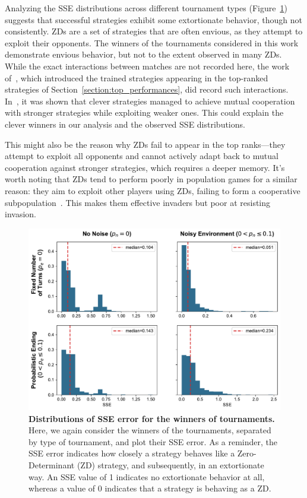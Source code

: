 \documentclass{article}
\begin{document}
Analyzing the SSE distributions across different tournament types
(Figure~\ref{fig:discussion_sse}) suggests that successful strategies exhibit
some extortionate behavior, though not consistently. ZDs are a set of strategies
that are often envious, as they attempt to exploit their opponents. The winners
of the tournaments considered in this work demonstrate envious behavior, but not
to the extent observed in many ZDs. While the exact interactions between matches
are not recorded here, the work of~\cite{Harper2017}, which introduced the
trained strategies appearing in the top-ranked strategies of
Section~\ref{section:top_performances}, did record such interactions.
In~\cite{Harper2017}, it was shown that clever strategies managed to achieve
mutual cooperation with stronger strategies while exploiting weaker ones. This
could explain the clever winners in our analysis and the observed SSE
distributions.

This might also be the reason why ZDs fail to appear in the top ranks—they
attempt to exploit all opponents and cannot actively adapt back to mutual
cooperation against stronger strategies, which requires a deeper memory. It's
worth noting that ZDs tend to perform poorly in population games for a similar
reason: they aim to exploit other players using ZDs, failing to form a
cooperative subpopulation~\cite{Knight2018evolution}. This makes them effective
invaders but poor at resisting invasion.

\begin{figure}[!htbp]
    \centering
        \centering
        \includegraphics[width=.75\textwidth]{../images/sse.pdf}
        \caption{\textbf{Distributions of SSE error for the winners of tournaments.}
        Here, we again consider the winners of the tournaments, separated by type of
        tournament, and plot their SSE error. As a reminder, the SSE error indicates how
        closely a strategy behaves like a Zero-Determinant (ZD) strategy, and
        subsequently, in an extortionate way. An SSE value of 1 indicates no
        extortionate behavior at all, whereas a value of 0 indicates that a strategy is
        behaving as a ZD.}
        \label{fig:discussion_sse}
\end{figure}
\end{document}
